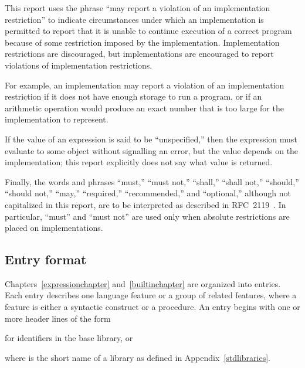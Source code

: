 \vest This report uses the phrase ``may report a violation of an
implementation restriction'' to indicate circumstances under which an
implementation is permitted to report that it is unable to continue
execution of a correct program because of some restriction imposed by the
implementation.  Implementation restrictions are discouraged,
but implementations are encouraged to report violations of implementation
restrictions.

\vest For example, an implementation may report a violation of an
implementation restriction if it does not have enough storage to run a
program,
or if an arithmetic operation would produce an exact number that is
too large for the implementation to represent.

\vest If the value of an expression is said to be ``unspecified,'' then
the expression must evaluate to some object without signalling an error,
but the value depends on the implementation; this report explicitly does
not say what value is returned. 

Finally, the words and phrases ``must,'' ``must not,'' ``shall,''
``shall not,'' ``should,'' ``should not,'' ``may,'' ``required,''
``recommended,'' and ``optional,'' although not capitalized in this
report, are to be interpreted as described in RFC~2119~\cite{rfc2119}.
In particular, ``must'' and ``must not'' are used only when
absolute restrictions are placed on implementations.



\subsection{Entry format}

Chapters~\ref{expressionchapter} and~\ref{builtinchapter} are organized
into entries.  Each entry describes one language feature or a group of
related features, where a feature is either a syntactic construct or a
procedure.  An entry begins with one or more header lines of the form

\noindent{}\unpenalty

for identifiers in the base library, or

\noindent{}\unpenalty

where  is the short name of a library
as defined in Appendix~\ref{stdlibraries}.

